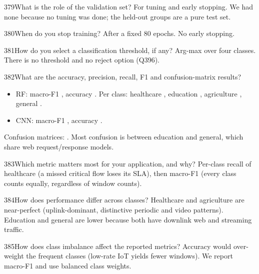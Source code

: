 \begin{qa}{379}{What is the role of the validation set?}
For tuning and early stopping. We had none because no tuning was done; the held-out groups are a pure test set.
\end{qa}

\begin{qa}{380}{When do you stop training?}
After a fixed 80 epochs. No early stopping.
\end{qa}

\begin{qa}{381}{How do you select a classification threshold, if any?}
Arg-max over four classes. There is no threshold and no reject option (Q396).
\end{qa}

\begin{qa}{382}{What are the accuracy, precision, recall, F1 and confusion-matrix results?}
\begin{itemize}
\item RF: macro-F1 \NSnRfFone, accuracy \NSnRfAcc. Per class: healthcare \NSnRfHealthcare, education
\NSnRfEducation, agriculture \NSnRfAgriculture, general \NSnRfGeneral.
\item CNN: macro-F1 \NSnCnnFone, accuracy \NSnCnnAcc.
\end{itemize}
Confusion matrices: . Most confusion is between education and general,
which share web request/response models.
\end{qa}

\begin{qa}{383}{Which metric matters most for your application, and why?}
Per-class recall of healthcare (a missed critical flow loses its SLA), then macro-F1 (every class counts equally,
regardless of window counts).
\end{qa}

\begin{qa}{384}{How does performance differ across classes?}
Healthcare and agriculture are near-perfect (uplink-dominant, distinctive periodic and video patterns). Education and
general are lower because both have downlink web and streaming traffic.
\end{qa}

\begin{qa}{385}{How does class imbalance affect the reported metrics?}
Accuracy would over-weight the frequent classes (low-rate IoT yields fewer windows). We report macro-F1 and use
balanced class weights.
\end{qa}

